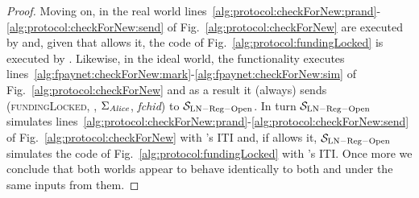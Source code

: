 \begin{proof}
  Moving on, in the real world
  lines~\ref{alg:protocol:checkForNew:prand}-\ref{alg:protocol:checkForNew:send} of
  Fig.~\ref{alg:protocol:checkForNew} are executed by \alice{} and, given that
  \adversary{} allows it, the code of Fig.~\ref{alg:protocol:fundingLocked} is
  executed by \bob. Likewise, in the ideal world, the functionality executes
  lines~\ref{alg:fpaynet:checkForNew:mark}-\ref{alg:fpaynet:checkForNew:sim} of
  Fig.~\ref{alg:protocol:checkForNew} and as
  a result it (always) sends (\textsc{fundingLocked}, \alice, $\Sigma_{\mathit{Alice}}$,
  \textit{fchid}) to $\mathcal{S}_{\mathrm{LN - Reg - Open}}$. In turn
  $\mathcal{S}_{\mathrm{LN - Reg - Open}}$ simulates
  lines~\ref{alg:protocol:checkForNew:prand}-\ref{alg:protocol:checkForNew:send}
  of Fig.~\ref{alg:protocol:checkForNew} with \alice's ITI and, if \adversary{}
  allows it, $\mathcal{S}_{\mathrm{LN - Reg - Open}}$ simulates the code of
  Fig.~\ref{alg:protocol:fundingLocked} with \bob's ITI. Once more we conclude
  that both worlds appear to behave identically to both \environment{} and
  \adversary{} under the same inputs from them.
\end{proof}
